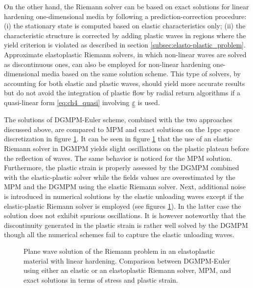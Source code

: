 On the other hand, the Riemann solver can be based on exact solutions for linear hardening one-dimensional media \cite{Thomas_EP,Wang} by following a prediction-correction procedure: (i) the stationary state is computed based on elastic characteristics only; (ii) the characteristic structure is corrected by adding plastic waves in regions where the yield criterion is violated as described in section \ref{subsec:elasto-plastic_problem}.
Approximate elastoplastic Riemann solvers, in which non-linear waves are solved as discontinuous ones, can also be employed for non-linear hardening one-dimensional media based on the same solution scheme.
This type of solvers, by accounting for both elastic and plastic waves, should yield more accurate results but do not avoid the integration of plastic flow by radial return algorithms if a quasi-linear form \eqref{eq:ch4_quasi} involving ${\underline{\underline{\varepsilon}}}$ is used.

The solutions of DGMPM-Euler scheme, combined with the two approaches discussed above, are compared to MPM and exact solutions on the 1ppc space discretization in figure \ref{fig:RP_EP_dgmpm_mpm}.
It can be seen in figure \ref{fig:RP_EP_dgmpm_mpm} that the use of an elastic Riemann solver in DGMPM yields slight oscillations on the plastic plateau before the reflection of waves.
The same behavior is noticed for the MPM solution.
Furthermore, the plastic strain is properly assessed by the DGMPM combined with the elastic-plastic solver while the fields values are overestimated by the MPM and the DGMPM using the elastic Riemann solver.
Next, additional noise is introduced in numerical solutions by the elastic unloading waves except if the elastic-plastic Riemann solver is employed (see figures \ref{fig:RP_EP_dgmpm_mpm}).
In the latter case the solution does not exhibit spurious oscillations.
It is however noteworthy that the discontinuity generated in the plastic strain is rather well solved by the DGMPM though all the numerical schemes fail to capture the elastic unloading waves.

\begin{figure}[h!]
  \centering
  { \label{subfig:ep_dgmpm_mpm1}}
  { \label{subfig:ep_dgmpm_mpm3}}
  {}
  \caption{Plane wave solution of the Riemann problem in an elastoplastic material with linear hardening. Comparison between DGMPM-Euler using either an elastic or an elastoplastic Riemann solver, MPM, and exact solutions in terms of stress and plastic strain.}
  \label{fig:RP_EP_dgmpm_mpm}
\end{figure}


